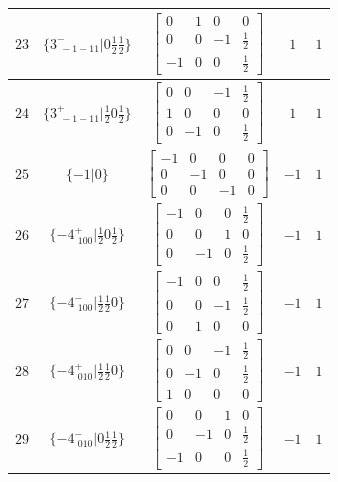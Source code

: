 \documentclass[fleqn,8pt]{jsarticle}
\begin{document}
\begin{longtable}{ccccc}
$ 23 $ & $ \{3^{-}_{\,\,-1-11}|0 \frac{1}{2} \frac{1}{2}\} $ & $ \begin{bmatrix} 0 & 1 & 0 & 0 \\ 0 & 0 & -1 & \frac{1}{2} \\ -1 & 0 & 0 & \frac{1}{2} \end{bmatrix} $ & $ 1 $ & $ 1 $ \\ \hline
$ 24 $ & $ \{3^{+}_{\,\,-1-11}|\frac{1}{2} 0 \frac{1}{2}\} $ & $ \begin{bmatrix} 0 & 0 & -1 & \frac{1}{2} \\ 1 & 0 & 0 & 0 \\ 0 & -1 & 0 & \frac{1}{2} \end{bmatrix} $ & $ 1 $ & $ 1 $ \\ \hline
$ 25 $ & $ \{-1|0\} $ & $ \begin{bmatrix} -1 & 0 & 0 & 0 \\ 0 & -1 & 0 & 0 \\ 0 & 0 & -1 & 0 \end{bmatrix} $ & $ -1 $ & $ 1 $ \\ \hline
$ 26 $ & $ \{-4^{+}_{\,\,100}|\frac{1}{2} 0 \frac{1}{2}\} $ & $ \begin{bmatrix} -1 & 0 & 0 & \frac{1}{2} \\ 0 & 0 & 1 & 0 \\ 0 & -1 & 0 & \frac{1}{2} \end{bmatrix} $ & $ -1 $ & $ 1 $ \\ \hline
$ 27 $ & $ \{-4^{-}_{\,\,100}|\frac{1}{2} \frac{1}{2} 0\} $ & $ \begin{bmatrix} -1 & 0 & 0 & \frac{1}{2} \\ 0 & 0 & -1 & \frac{1}{2} \\ 0 & 1 & 0 & 0 \end{bmatrix} $ & $ -1 $ & $ 1 $ \\ \hline
$ 28 $ & $ \{-4^{+}_{\,\,010}|\frac{1}{2} \frac{1}{2} 0\} $ & $ \begin{bmatrix} 0 & 0 & -1 & \frac{1}{2} \\ 0 & -1 & 0 & \frac{1}{2} \\ 1 & 0 & 0 & 0 \end{bmatrix} $ & $ -1 $ & $ 1 $ \\ \hline
$ 29 $ & $ \{-4^{-}_{\,\,010}|0 \frac{1}{2} \frac{1}{2}\} $ & $ \begin{bmatrix} 0 & 0 & 1 & 0 \\ 0 & -1 & 0 & \frac{1}{2} \\ -1 & 0 & 0 & \frac{1}{2} \end{bmatrix} $ & $ -1 $ & $ 1 $ \\ \hline

\end{longtable}
\end{document}
